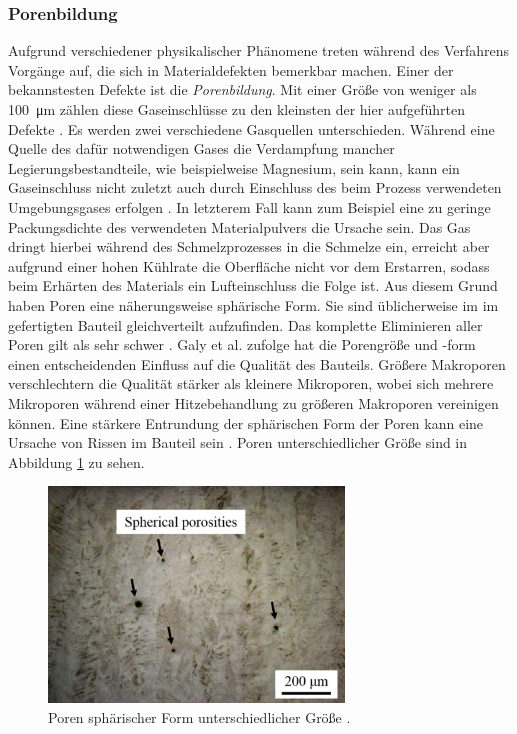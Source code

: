 		\subsubsection{Porenbildung}
		Aufgrund verschiedener physikalischer Phänomene treten während des Verfahrens Vorgänge auf,
		die sich in Materialdefekten bemerkbar machen. Einer der bekannstesten Defekte ist die
		\emph{Porenbildung}. Mit einer Größe von weniger als \SI{100}{\micro\meter} zählen diese
		Gaseinschlüsse zu den kleinsten der hier aufgeführten Defekte \cite{zhang2017defect}. Es
		werden zwei verschiedene Gasquellen unterschieden. Während eine Quelle des dafür
		notwendigen Gases die Verdampfung mancher Legierungsbestandteile, wie beispielweise
		Magnesium, sein kann, kann ein Gaseinschluss nicht zuletzt auch durch Einschluss des beim
		Prozess verwendeten Umgebungsgases erfolgen \cite{galy2018main}. In letzterem Fall kann
		zum Beispiel eine zu geringe Packungsdichte des verwendeten Materialpulvers die Ursache
		sein. Das Gas dringt hierbei während des Schmelzprozesses in die Schmelze ein, erreicht
		aber aufgrund einer hohen Kühlrate die Oberfläche nicht vor dem Erstarren, sodass beim
		Erhärten des Materials ein Lufteinschluss die Folge ist. Aus diesem Grund haben Poren eine
		näherungsweise sphärische Form. Sie sind üblicherweise im im gefertigten Bauteil
		gleichverteilt aufzufinden. Das komplette Eliminieren aller Poren gilt als sehr schwer
		\cite{zhang2017defect}. Galy et al. zufolge hat die Porengröße und -form einen
		entscheidenden Einfluss auf die Qualität des Bauteils. Größere Makroporen verschlechtern
		die Qualität stärker als kleinere Mikroporen, wobei sich mehrere Mikroporen während einer
		Hitzebehandlung zu größeren Makroporen vereinigen können. Eine stärkere Entrundung der
		sphärischen Form der Poren kann eine Ursache von Rissen im Bauteil sein
		\cite{galy2018main}. Poren unterschiedlicher Größe sind in Abbildung
		\ref{fig:defects_porosities} zu sehen.

		\begin{figure}[ht]
			\centering
			\includegraphics[width=0.7\textwidth]{chapter/main/img/defects/porosities.png}
			\caption{Poren sphärischer Form unterschiedlicher Größe \cite{zhang2017defect}.}
			\label{fig:defects_porosities}
		\end{figure}

